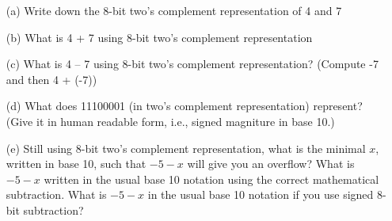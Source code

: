 \mbox{}
\begin{enumerate}
\item[(a)] Write down the 8-bit two’s complement representation of 4 and 7
\item[(b)] What is 4 + 7 using 8-bit two’s complement representation
\item[(c)] What is 4 – 7 using 8-bit two’s complement representation? (Compute -7 and then 4 + (-7))
\item[(d)] What does 11100001 (in two’s complement representation) represent?
  (Give it in human readable form, i.e., signed magniture in base 10.)
 \item[(e)] Still using 8-bit two's complement representation,
    what is the minimal $x$, written in base 10, such that
    $-5 - x$ will give you an overflow?
    What is $-5 - x$ written in the usual base 10 notation using the correct
    mathematical subtraction.
    What is $-5 - x$ in the usual base 10 notation if you use
    signed 8-bit subtraction?
\end{enumerate}
